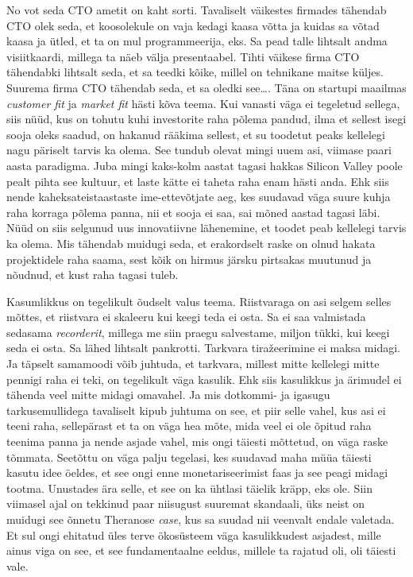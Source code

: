 
No vot seda CTO ametit on kaht sorti. Tavaliselt väikestes firmades tähendab 
CTO olek seda, et koosolekule on vaja kedagi kaasa võtta ja kuidas sa võtad 
kaasa ja ütled, et ta on mul programmeerija, eks. Sa pead talle lihtsalt andma 
visiitkaardi, millega ta näeb välja presentaabel. Tihti väikese firma CTO 
tähendabki lihtsalt seda, et sa teedki kõike, millel on tehnikane maitse 
küljes. Suurema firma CTO tähendab seda, et sa oledki see\ldots. Täna on 
startupi maailmas \emph{customer fit} ja \emph{market fit} hästi kõva teema. 
Kui vanasti väga ei tegeletud sellega, siis nüüd, kus on tohutu kuhi 
investorite raha põlema pandud, ilma et sellest isegi sooja oleks saadud, on hakanud rääkima sellest, et su toodetut peaks kellelegi nagu päriselt
tarvis ka olema. See tundub olevat mingi uuem asi, viimase paari aasta 
paradigma. Juba mingi kaks-kolm aastat tagasi hakkas Silicon Valley poole pealt 
pihta see kultuur, et laste kätte ei taheta raha enam hästi anda. Ehk siis 
nende kaheksateistaastaste ime-ettevõtjate aeg, kes suudavad  väga suure kuhja raha 
korraga põlema panna, nii et sooja ei saa, sai mõned aastad 
tagasi läbi. Nüüd on siis selgunud uus innovatiivne lähenemine, et toodet peab 
kellelegi tarvis ka olema. Mis tähendab muidugi 
seda, et erakordselt raske on olnud hakata projektidele raha saama, sest kõik 
on hirmus järsku pirtsakas muutunud ja nõudnud, et kust raha tagasi tuleb. 


Kasumlikkus  on tegelikult õudselt valus teema. Riistvaraga on  
asi  selgem selles mõttes, et riistvara ei skaleeru kui keegi teda ei osta. Sa ei 
saa valmistada sedasama \emph{recorderit}, millega me siin praegu salvestame, 
miljon tükki, kui keegi seda ei osta. Sa lähed lihtsalt 
pankrotti. Tarkvara tiražeerimine ei maksa midagi. Ja täpselt samamoodi võib  
juhtuda, et tarkvara, millest mitte kellelegi mitte pennigi raha ei teki, on 
tegelikult väga kasulik. Ehk siis kasulikkus ja ärimudel ei tähenda veel mitte 
midagi omavahel. Ja mis dotkommi- ja igasugu tarkusemullidega tavaliselt kipub juhtuma on see, et piir selle vahel, kus asi ei teeni 
raha, sellepärast et ta on väga hea mõte, mida veel ei ole õpitud raha  
teenima panna ja nende asjade vahel, mis ongi täiesti mõttetud, on väga raske tõmmata. 
Seetõttu on väga palju tegelasi, kes suudavad maha müüa  täiesti kasutu idee 
öeldes, et see ongi enne monetariseerimist faas ja see peagi midagi tootma. 
Unustades ära selle, et see on ka ühtlasi täielik kräpp, eks ole. Siin  
viimasel ajal on tekkinud paar niisugust suuremat skandaali, üks neist on 
muidugi see õnnetu Theranose \emph{case}, kus sa suudad nii veenvalt endale 
valetada. Et sul ongi ehitatud üles terve ökosüsteem väga kasulikkudest 
asjadest, mille ainus viga on see, et see fundamentaalne eeldus, millele ta 
rajatud oli, oli täiesti vale. 

